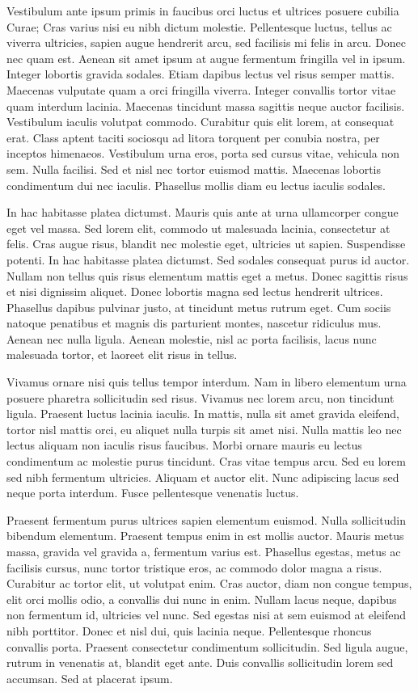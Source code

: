 Vestibulum ante ipsum primis in faucibus orci luctus et ultrices posuere cubilia
Curae; Cras varius nisi eu nibh dictum molestie. Pellentesque luctus, tellus ac
viverra ultricies, sapien augue hendrerit arcu, sed facilisis mi felis in arcu.
Donec nec quam est. Aenean sit amet ipsum at augue fermentum fringilla vel in
ipsum. Integer lobortis gravida sodales. Etiam dapibus lectus vel risus semper
mattis. Maecenas vulputate quam a orci fringilla viverra. Integer convallis
tortor vitae quam interdum lacinia. Maecenas tincidunt massa sagittis neque
auctor facilisis. Vestibulum iaculis volutpat commodo. Curabitur quis elit lorem,
at consequat erat. Class aptent taciti sociosqu ad litora torquent per conubia
nostra, per inceptos himenaeos. Vestibulum urna eros, porta sed cursus vitae,
vehicula non sem. Nulla facilisi. Sed et nisl nec tortor euismod mattis.
Maecenas lobortis condimentum dui nec iaculis. Phasellus mollis diam eu lectus
iaculis sodales.


In hac habitasse platea dictumst. Mauris quis ante at urna ullamcorper congue
eget vel massa. Sed lorem elit, commodo ut malesuada lacinia, consectetur at
felis. Cras augue risus, blandit nec molestie eget, ultricies ut sapien.
Suspendisse potenti. In hac habitasse platea dictumst. Sed sodales consequat
purus id auctor. Nullam non tellus quis risus elementum mattis eget a metus.
Donec sagittis risus et nisi dignissim aliquet. Donec lobortis magna sed lectus
hendrerit ultrices. Phasellus dapibus pulvinar justo, at tincidunt metus rutrum
eget. Cum sociis natoque penatibus et magnis dis parturient montes, nascetur
ridiculus mus. Aenean nec nulla ligula. Aenean molestie, nisl ac porta
facilisis, lacus nunc malesuada tortor, et laoreet elit risus in tellus.


Vivamus ornare nisi quis tellus tempor interdum. Nam in libero elementum urna
posuere pharetra sollicitudin sed risus. Vivamus nec lorem arcu, non tincidunt
ligula. Praesent luctus lacinia iaculis. In mattis, nulla sit amet gravida
eleifend, tortor nisl mattis orci, eu aliquet nulla turpis sit amet nisi.
Nulla mattis leo nec lectus aliquam non iaculis risus faucibus. Morbi ornare
mauris eu lectus condimentum ac molestie purus tincidunt. Cras vitae tempus
arcu. Sed eu lorem sed nibh fermentum ultricies. Aliquam et auctor elit. Nunc
adipiscing lacus sed neque porta interdum. Fusce pellentesque venenatis luctus.


Praesent fermentum purus ultrices sapien elementum euismod. Nulla sollicitudin
bibendum elementum. Praesent tempus enim in est mollis auctor. Mauris metus
massa, gravida vel gravida a, fermentum varius est. Phasellus egestas, metus ac
facilisis cursus, nunc tortor tristique eros, ac commodo dolor magna a risus.
Curabitur ac tortor elit, ut volutpat enim. Cras auctor, diam non congue tempus,
elit orci mollis odio, a convallis dui nunc in enim. Nullam lacus neque, dapibus
non fermentum id, ultricies vel nunc. Sed egestas nisi at sem euismod at
eleifend nibh porttitor. Donec et nisl dui, quis lacinia neque. Pellentesque
rhoncus convallis porta. Praesent consectetur condimentum sollicitudin. Sed
ligula augue, rutrum in venenatis at, blandit eget ante. Duis convallis
sollicitudin lorem sed accumsan. Sed at placerat ipsum.



